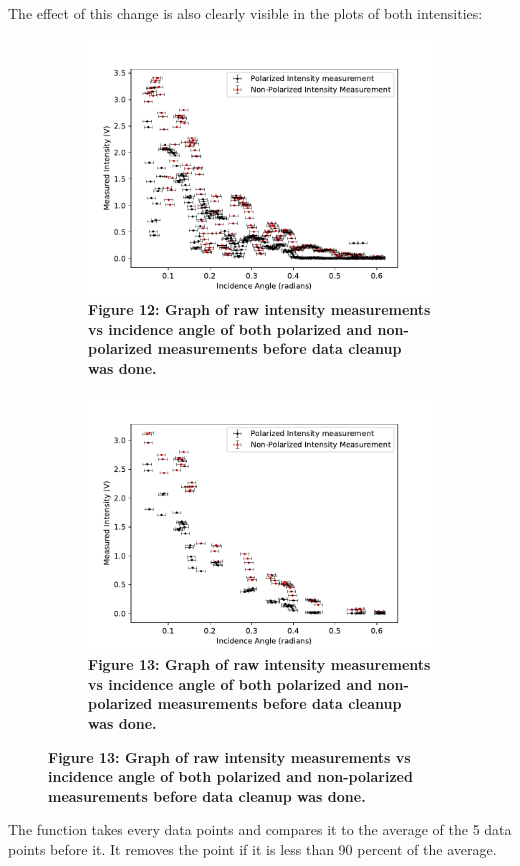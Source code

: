 \documentclass[
	letterpaper, %
	10pt, %
]{CSUniSchoolLabReport}
\begin{document}
The effect of this change is also clearly visible in the plots of both intensities:
\begin{figure}[H]
	\begin{subfigure}{0.45\textwidth}
		\centering
		\includegraphics[width=\textwidth]{../figures/figure12.pdf}
		\caption{\textbf{Figure 12: Graph of raw intensity measurements vs incidence angle of both polarized and non-polarized measurements before data cleanup was done. }}
	\end{subfigure}
	\hfill
	\begin{subfigure}{0.45\textwidth}
		\includegraphics[width=\textwidth]{../figures/figure13.pdf}
		\caption{\textbf{Figure 13: Graph of raw intensity measurements vs incidence angle of both polarized and non-polarized measurements before data cleanup was done.}}
	\end{subfigure}
\end{figure}
The function takes every data points and compares it to the average of the 5 data points before it. It removes the
point if it is less than 90 percent of the average.\\
\end{document}
